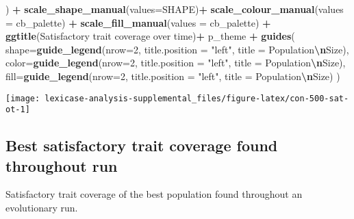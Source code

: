 \documentclass[
]{book}
\newenvironment{Shaded}{\begin{snugshade}}{\end{snugshade}}
\newcommand{\AttributeTok}[1]{\textcolor[rgb]{0.13,0.29,0.53}{#1}}
\newcommand{\DecValTok}[1]{\textcolor[rgb]{0.00,0.00,0.81}{#1}}
\newcommand{\FunctionTok}[1]{\textcolor[rgb]{0.13,0.29,0.53}{\textbf{#1}}}
\newcommand{\NormalTok}[1]{#1}
\newcommand{\SpecialCharTok}[1]{\textcolor[rgb]{0.81,0.36,0.00}{\textbf{#1}}}
\newcommand{\StringTok}[1]{\textcolor[rgb]{0.31,0.60,0.02}{#1}}
\begin{document}
\begin{Shaded}
\begin{Highlighting}[]
\NormalTok{  ) }\SpecialCharTok{+}
  \FunctionTok{scale\_shape\_manual}\NormalTok{(}\AttributeTok{values=}\NormalTok{SHAPE)}\SpecialCharTok{+}
  \FunctionTok{scale\_colour\_manual}\NormalTok{(}\AttributeTok{values =}\NormalTok{ cb\_palette) }\SpecialCharTok{+}
  \FunctionTok{scale\_fill\_manual}\NormalTok{(}\AttributeTok{values =}\NormalTok{ cb\_palette) }\SpecialCharTok{+}
  \FunctionTok{ggtitle}\NormalTok{(}\StringTok{\textquotesingle{}Satisfactory trait coverage over time\textquotesingle{}}\NormalTok{)}\SpecialCharTok{+}
\NormalTok{  p\_theme }\SpecialCharTok{+}
  \FunctionTok{guides}\NormalTok{(}
    \AttributeTok{shape=}\FunctionTok{guide\_legend}\NormalTok{(}\AttributeTok{nrow=}\DecValTok{2}\NormalTok{, }\AttributeTok{title.position =} \StringTok{"left"}\NormalTok{, }\AttributeTok{title =} \StringTok{\textquotesingle{}Population}\SpecialCharTok{\textbackslash{}n}\StringTok{Size\textquotesingle{}}\NormalTok{),}
    \AttributeTok{color=}\FunctionTok{guide\_legend}\NormalTok{(}\AttributeTok{nrow=}\DecValTok{2}\NormalTok{, }\AttributeTok{title.position =} \StringTok{"left"}\NormalTok{, }\AttributeTok{title =} \StringTok{\textquotesingle{}Population}\SpecialCharTok{\textbackslash{}n}\StringTok{Size\textquotesingle{}}\NormalTok{),}
    \AttributeTok{fill=}\FunctionTok{guide\_legend}\NormalTok{(}\AttributeTok{nrow=}\DecValTok{2}\NormalTok{, }\AttributeTok{title.position =} \StringTok{"left"}\NormalTok{, }\AttributeTok{title =} \StringTok{\textquotesingle{}Population}\SpecialCharTok{\textbackslash{}n}\StringTok{Size\textquotesingle{}}\NormalTok{)}
\NormalTok{  )}
\end{Highlighting}
\end{Shaded}

\texttt{[image: lexicase-analysis-supplemental\_files/figure-latex/con-500-sat-ot-1]}

\hypertarget{best-satisfactory-trait-coverage-found-throughout-run-3}{%
\subsection{Best satisfactory trait coverage found throughout run}\label{best-satisfactory-trait-coverage-found-throughout-run-3}}

Satisfactory trait coverage of the best population found throughout an evolutionary run.
\end{document}
